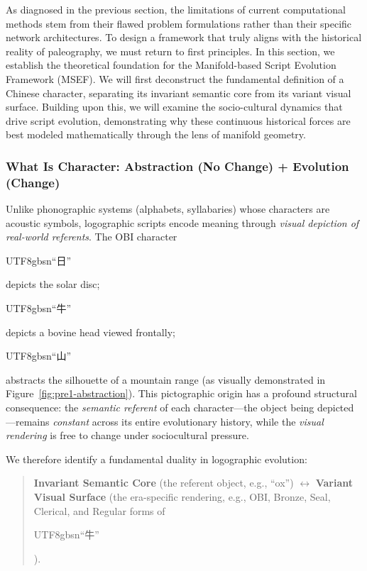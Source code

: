 \documentclass{article}
\begin{document}
As diagnosed in the previous section, the limitations of current computational methods stem from their flawed problem formulations rather than their specific network architectures. To design a framework that truly aligns with the historical reality of paleography, we must return to first principles. In this section, we establish the theoretical foundation for the Manifold-based Script Evolution Framework (MSEF). We will first deconstruct the fundamental definition of a Chinese character, separating its invariant semantic core from its variant visual surface. Building upon this, we will examine the socio-cultural dynamics that drive script evolution, demonstrating why these continuous historical forces are best modeled mathematically through the lens of manifold geometry.


\subsubsection{What Is Character: Abstraction (No Change) + Evolution (Change)}
\label{sec:pre:s5}

Unlike phonographic systems (alphabets, syllabaries) whose characters are acoustic symbols, logographic scripts encode meaning through \emph{visual depiction of real-world referents}.
The OBI character \begin{CJK}{UTF8}{gbsn}``日''\end{CJK}
depicts the solar disc; \begin{CJK}{UTF8}{gbsn}``牛''\end{CJK}
depicts a bovine head viewed frontally; \begin{CJK}{UTF8}{gbsn}``山''\end{CJK} abstracts the silhouette of a mountain range (as visually demonstrated in Figure~\ref{fig:pre1-abstraction}). This pictographic origin has a profound structural consequence: the \emph{semantic referent} of each character—the object being depicted—remains \emph{constant} across its entire evolutionary history, while the \emph{visual rendering} is free to change under sociocultural pressure.

We therefore identify a fundamental duality in logographic evolution:

\begin{quote}
  \textbf{Invariant Semantic Core} (the referent object, e.g., ``ox'') $\longleftrightarrow$ \textbf{Variant Visual Surface} (the era-specific rendering, e.g., OBI, Bronze, Seal, Clerical, and Regular forms of \begin{CJK}{UTF8}{gbsn}``牛''\end{CJK}).
\end{quote}
\end{document}
